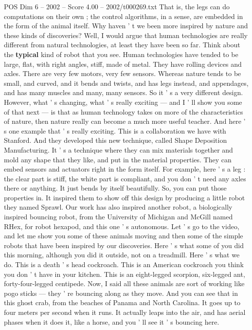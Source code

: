 \begin{textsample}{POS Dim 6 – 2002 – Score 4.00 – 2002/t000269.txt}
That is, the legs can do computations on their own ; the control algorithms, in a sense, are embedded in the form of the animal itself.
Why haven ' t we been more inspired by nature and these kinds of discoveries?
Well, I would argue that human technologies are really different from natural technologies, at least they have been so far.
Think about the \textbf{typical} kind of robot that you see.
Human technologies have tended to be large, flat, with right angles, stiff, made of metal.
They have rolling devices and axles.
There are very few motors, very few sensors.
Whereas nature tends to be small, and curved, and it bends and twists, and has legs instead, and appendages, and has many muscles and many, many sensors.
So it ' s a very different design.
However, what ' s changing, what ' s really exciting — and I ' ll show you some of that next — is that as human technology takes on more of the characteristics of nature, then nature really can become a much more useful teacher.
And here ' s one example that ' s really exciting.
This is a collaboration we have with Stanford.
And they developed this new technique, called Shape Deposition Manufacturing.
It ' s a technique where they can mix materials together and mold any shape that they like, and put in the material properties.
They can embed sensors and actuators right in the form itself.
For example, here ' s a leg : the clear part is stiff, the white part is compliant, and you don ' t need any axles there or anything.
It just bends by itself beautifully.
So, you can put those properties in.
It inspired them to show off this design by producing a little robot they named Sprawl.
Our work has also inspired another robot, a biologically inspired bouncing robot, from the University of Michigan and McGill named RHex, for robot hexapod, and this one ' s autonomous.
Let ' s go to the video, and let me show you some of these animals moving and then some of the simple robots that have been inspired by our discoveries.
Here ' s what some of you did this morning, although you did it outside, not on a treadmill.
Here ' s what we do.
This is a death ' s head cockroach.
This is an American cockroach you think you don ' t have in your kitchen.
This is an eight-legged scorpion, six-legged ant, forty-four-legged centipede.
Now, I said all these animals are sort of working like pogo sticks — they ' re bouncing along as they move.
And you can see that in this ghost crab, from the beaches of Panama and North Carolina.
It goes up to four meters per second when it runs.
It actually leaps into the air, and has aerial phases when it does it, like a horse, and you ' ll see it ' s bouncing here.

\end{textsample}
